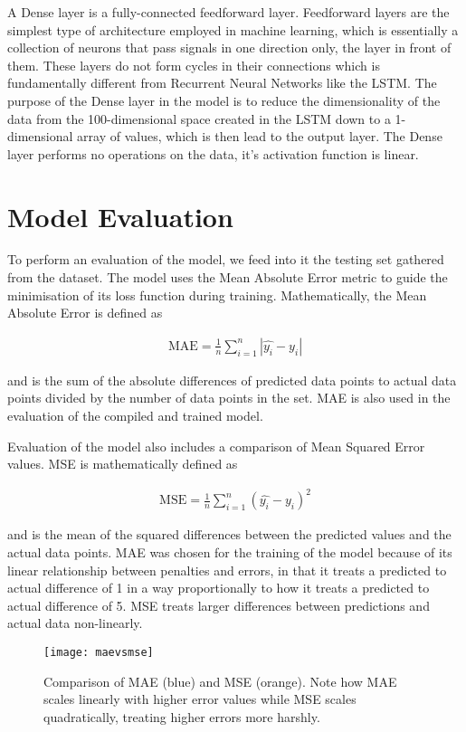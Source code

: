 A Dense layer is a fully-connected feedforward layer. Feedforward layers are the simplest type of architecture employed in machine learning, which is essentially a collection of neurons that pass signals in one direction only, the layer in front of them. These layers do not form cycles in their connections which is fundamentally different from Recurrent Neural Networks like the LSTM. The purpose of the Dense layer in the model is to reduce the dimensionality of the data from the 100-dimensional space created in the LSTM down to a 1-dimensional array of values, which is then lead to the output layer. The Dense layer performs no operations on the data, it's activation function is linear.

\section{Model Evaluation}
To perform an evaluation of the model, we feed into it the testing set gathered from the dataset. The model uses the Mean Absolute Error metric to guide the minimisation of its loss function during training. Mathematically, the Mean Absolute Error is defined as

\begin{align}
    \text{MAE} = \frac{1}{n} \sum\limits_{i=1}^{n} {|\hat{y_i} - y_i|}
\end{align}

and is the sum of the absolute differences of predicted data points to actual data points divided by the number of data points in the set. MAE is also used in the evaluation of the compiled and trained model.

Evaluation of the model also includes a comparison of Mean Squared Error values. MSE is mathematically defined as

\begin{align}
    \text{MSE} = \frac{1}{n} \sum\limits_{i=1}^{n} {(\hat{y_i} - y_i)^2}    
\end{align}

and is the mean of the squared differences between the predicted values and the actual data points. MAE was chosen for the training of the model because of its linear relationship between penalties and errors, in that it treats a predicted to actual difference of 1 in a way proportionally to how it treats a predicted to actual difference of 5. MSE treats larger differences between predictions and actual data non-linearly. 

\begin{figure}[H]
    \centering
    \texttt{[image: maevsmse]}
    \caption{Comparison of MAE (blue) and MSE (orange). Note how MAE scales linearly with higher error values while MSE scales quadratically, treating higher errors more harshly.}
    \label{tab:maevsmse}
\end{figure}